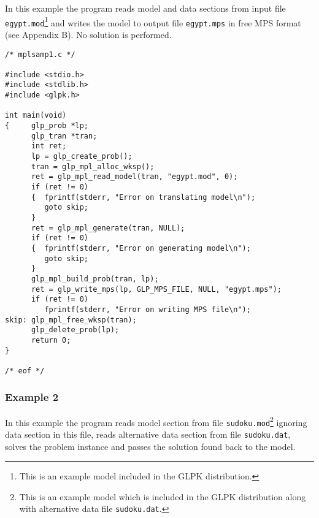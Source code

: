 In this example the program reads model and data sections from input
file \verb|egypt.mod|\footnote{This is an example model included in
the GLPK distribution.} and writes the model to output file
\verb|egypt.mps| in free MPS format (see Appendix B). No solution is
performed.

\begin{small}
\begin{verbatim}
/* mplsamp1.c */

#include <stdio.h>
#include <stdlib.h>
#include <glpk.h>

int main(void)
{     glp_prob *lp;
      glp_tran *tran;
      int ret;
      lp = glp_create_prob();
      tran = glp_mpl_alloc_wksp();
      ret = glp_mpl_read_model(tran, "egypt.mod", 0);
      if (ret != 0)
      {  fprintf(stderr, "Error on translating model\n");
         goto skip;
      }
      ret = glp_mpl_generate(tran, NULL);
      if (ret != 0)
      {  fprintf(stderr, "Error on generating model\n");
         goto skip;
      }
      glp_mpl_build_prob(tran, lp);
      ret = glp_write_mps(lp, GLP_MPS_FILE, NULL, "egypt.mps");
      if (ret != 0)
         fprintf(stderr, "Error on writing MPS file\n");
skip: glp_mpl_free_wksp(tran);
      glp_delete_prob(lp);
      return 0;
}

/* eof */
\end{verbatim}
\end{small}

\subsubsection*{Example 2}

In this example the program reads model section from file
\verb|sudoku.mod|\footnote{This is an example model which is included
in the GLPK distribution along with alternative data file
{\tt sudoku.dat}.} ignoring data section in this file, reads alternative
data section from file \verb|sudoku.dat|, solves the problem instance
and passes the solution found back to the model.


